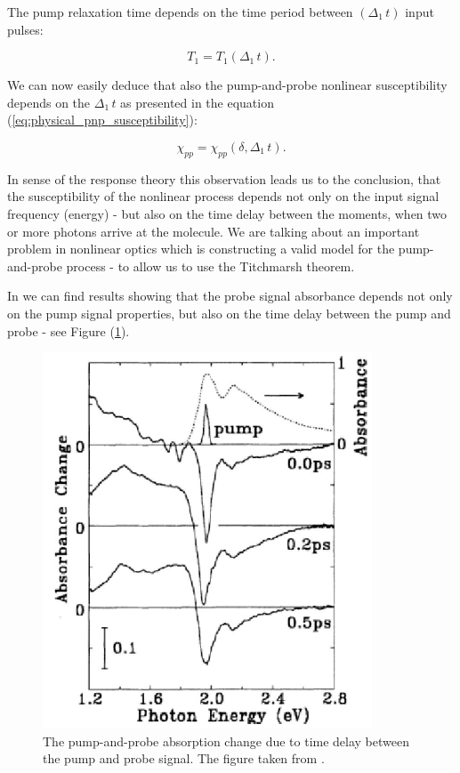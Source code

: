 \documentclass[12pt,twoside,a4paper]{article}
\numberwithin{equation}{subsection}
\numberwithin{figure}{subsection}
\begin{document}
The pump relaxation time depends on the time period between $( \Delta_1 \, t)$ input pulses:

\begin{equation} \label{eq:physical_periodtime}
   T_{1} =  T_{1} ( \Delta_1 \, t).
\end{equation}

We can now easily deduce that also the pump-and-probe nonlinear susceptibility depends on the $\Delta_1 \, t $ as presented in the equation
(\ref{eq:physical_pnp_susceptibility}):

\begin{equation} \label{eq:physical_pnp_susceptibility}
  \chi_{pp} = \chi_{pp} (\delta , \Delta_1 \, t).
\end{equation} 

In sense of the response theory this observation leads us to the conclusion, that the susceptibility of the nonlinear process depends not
only on the input signal frequency (energy) - but also on the time delay between the moments, when two or more photons arrive at
the molecule. We are talking about an important problem in nonlinear optics which is constructing a valid model for the pump-and-probe
process - to allow us to use the Titchmarsh theorem. 

In \cite{christodoulides_nonlinear} we can find results showing that the probe signal absorbance depends not only on the pump
signal properties, but also on the time delay between the pump and probe - see Figure (\ref{physical_fig:pnp_absorption}).

\begin{figure} 
	\begin{center}
		\includegraphics{img/pnp_abs.png}
		\caption{The pump-and-probe absorption change due to time delay between the pump and probe signal. The figure taken from
		\cite{christodoulides_nonlinear}. \label{physical_fig:pnp_absorption} }
	\end{center}
\end{figure}
\end{document}
